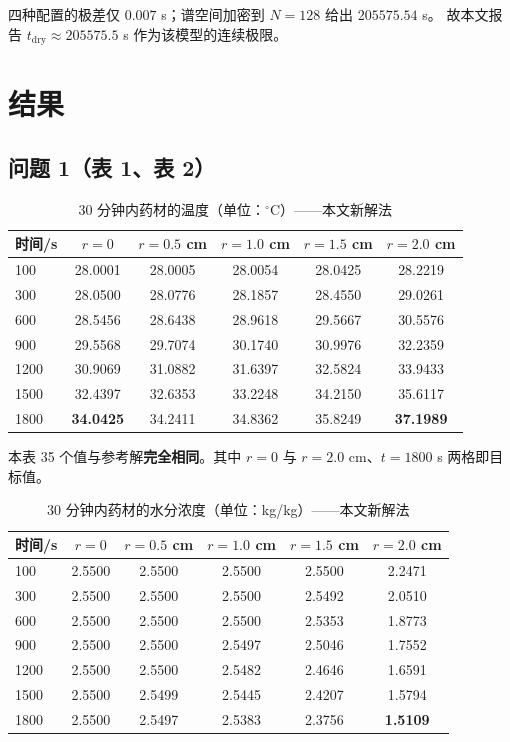 \documentclass[11pt,a4paper]{article}
\theoremstyle{definition}
\begin{document}
四种配置的极差仅 $0.007$ s；谱空间加密到 $N=128$ 给出 $205575.54$ s。
故本文报告 $t_{\text{dry}}\approx205575.5$ s 作为该模型的连续极限。

\section{结果}

\subsection{问题 1（表 1、表 2）}

\begin{table}[H]
\centering
\small
\caption{30 分钟内药材的温度（单位：$^\circ$C）——本文新解法}
\begin{tabular}{@{}lccccc@{}}
\toprule
时间/s & $r=0$ & $r=0.5$ cm & $r=1.0$ cm & $r=1.5$ cm & $r=2.0$ cm \\
\midrule
100  & 28.0001 & 28.0005 & 28.0054 & 28.0425 & 28.2219 \\
300  & 28.0500 & 28.0776 & 28.1857 & 28.4550 & 29.0261 \\
600  & 28.5456 & 28.6438 & 28.9618 & 29.5667 & 30.5576 \\
900  & 29.5568 & 29.7074 & 30.1740 & 30.9976 & 32.2359 \\
1200 & 30.9069 & 31.0882 & 31.6397 & 32.5824 & 33.9433 \\
1500 & 32.4397 & 32.6353 & 33.2248 & 34.2150 & 35.6117 \\
1800 & \textbf{34.0425} & 34.2411 & 34.8362 & 35.8249 & \textbf{37.1989} \\
\bottomrule
\end{tabular}
\end{table}

本表 35 个值与参考解\textbf{完全相同}。其中 $r=0$ 与 $r=2.0$ cm、$t=1800$ s 两格即目标值。

\begin{table}[H]
\centering
\small
\caption{30 分钟内药材的水分浓度（单位：kg/kg）——本文新解法}
\begin{tabular}{@{}lccccc@{}}
\toprule
时间/s & $r=0$ & $r=0.5$ cm & $r=1.0$ cm & $r=1.5$ cm & $r=2.0$ cm \\
\midrule
100  & 2.5500 & 2.5500 & 2.5500 & 2.5500 & 2.2471 \\
300  & 2.5500 & 2.5500 & 2.5500 & 2.5492 & 2.0510 \\
600  & 2.5500 & 2.5500 & 2.5500 & 2.5353 & 1.8773 \\
900  & 2.5500 & 2.5500 & 2.5497 & 2.5046 & 1.7552 \\
1200 & 2.5500 & 2.5500 & 2.5482 & 2.4646 & 1.6591 \\
1500 & 2.5500 & 2.5499 & 2.5445 & 2.4207 & 1.5794 \\
1800 & 2.5500 & 2.5497 & 2.5383 & 2.3756 & \textbf{1.5109} \\
\bottomrule
\end{tabular}
\end{table}
\end{document}
